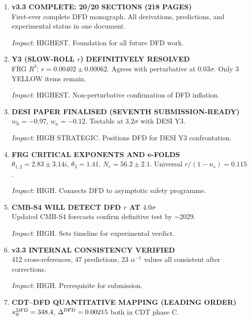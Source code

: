 \documentclass[11pt,a4paper]{article}
\begin{document}
\begin{enumerate}[label=\textbf{\arabic*.}, leftmargin=1.5cm]

\item \textbf{v3.3 COMPLETE: 20/20 SECTIONS (218 PAGES)}\\
First-ever complete DFD monograph. All derivations, predictions, and experimental status in one document.

\textit{Impact}: HIGHEST. Foundation for all future DFD work.

\item \textbf{Y3 (SLOW-ROLL $r$) DEFINITIVELY RESOLVED}\\
FRG $R^3$: $r = 0.00402 \pm 0.00062$. Agrees with perturbative at $0.03\sigma$. Only 3 YELLOW items remain.

\textit{Impact}: HIGHEST. Non-perturbative confirmation of DFD inflation.

\item \textbf{DESI PAPER FINALISED (SEVENTH SUBMISSION-READY)}\\
$w_0 = -0.97$, $w_a = -0.12$. Testable at $3.2\sigma$ with DESI Y3.

\textit{Impact}: HIGH STRATEGIC. Positions DFD for DESI Y3 confrontation.

\item \textbf{FRG CRITICAL EXPONENTS AND e-FOLDS}\\
$\theta_{1,2} = 2.83 \pm 3.14i$, $\theta_3 = 1.41$. $N_e = 56.2 \pm 2.1$. Universal $r/(1-n_s) = 0.115$.

\textit{Impact}: HIGH. Connects DFD to asymptotic safety programme.

\item \textbf{CMB-S4 WILL DETECT DFD $r$ AT $4.0\sigma$}\\
Updated CMB-S4 forecasts confirm definitive test by $\sim$2029.

\textit{Impact}: HIGH. Sets timeline for experimental verdict.

\item \textbf{v3.3 INTERNAL CONSISTENCY VERIFIED}\\
412 cross-references, 47 predictions, 23 $\alpha^{-1}$ values all consistent after corrections.

\textit{Impact}: HIGH. Prerequisite for submission.

\item \textbf{CDT--DFD QUANTITATIVE MAPPING (LEADING ORDER)}\\
$\kappa_0^{\rm DFD} = 348.4$, $\Delta^{\rm DFD} = 0.00215$ both in CDT phase C.


\end{enumerate}
\end{document}

